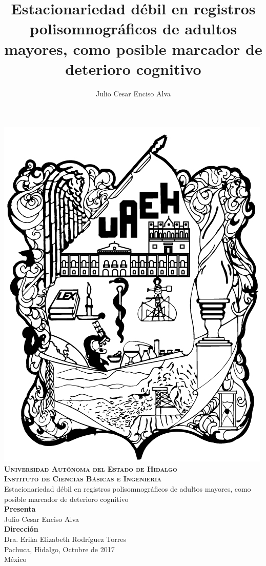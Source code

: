 \documentclass[12pt,letterpaper,draft]{book}
\begin{document}
\setcounter{page}{0}
\thispagestyle{empty}

\title{Estacionariedad débil en registros polisomnográficos de adultos mayores,
como posible marcador de deterioro cognitivo}
\author{Julio Cesar Enciso Alva}

{
\begin{center}
    \includegraphics[width=0.2\linewidth]{./img_oficiales/logo_uaeh.png}\\
    {\Large \textbf{ \textsc{
        Universidad Autónoma del Estado de Hidalgo\\
        Instituto de Ciencias Básicas e Ingeniería\\
        }}
    \vspace*{2.5em}
    }
    {\huge
        Estacionariedad débil en registros polisomnográficos de adultos mayores,
        como posible marcador de deterioro cognitivo\\
    \vspace*{2.5em}
    }
    {\large
        \textbf{Presenta}\\
        \vspace*{.25em}}
        {\Large
        Julio Cesar Enciso Alva\\
        \vspace*{3em}
        }
        {\large
        \textbf{Dirección}\\
        \vspace*{.25em}}
        {\Large
        Dra. Erika Elizabeth Rodríguez Torres\\
    \vspace*{3em}
    }
    {\large
    Pachuca, Hidalgo, Octubre de 2017\\
    M\'exico
    }
\end{center}
}

\newpage

\end{document}
